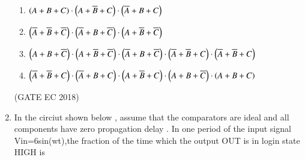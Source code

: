 \begin{enumerate}
\begin{enumerate}[label=(\Alph*)]
	\item $ \left(A+B+C\right) \cdot \left(A+\overline{B}+C\right) \cdot \left(\overline{A}+B+C\right) $
 	\item $ \left(\overline{A}+\overline{B}+\overline{C}\right) \cdot \left(\overline{A}+B+\overline{C}\right) \cdot \left(A+\overline{B}+\overline{C}\right) $
	\item $ \left(A+B+\overline{C}\right) \cdot \left(A+\overline{B}+\overline{C}\right) \cdot \left(\overline{A}+B+\overline{C}\right) \cdot \left(\overline{A}+\overline{B}+C\right) \cdot \left(\overline{A}+\overline{B}+C\right) $
	\item $ \left(\overline{A}+\overline{B}+C\right) \cdot \left(\overline{A}+B+C\right) \cdot \left(A+\overline{B}+C\right) \cdot \left(A+B+\overline{C}\right) \cdot \left(A+B+C\right) $
\end{enumerate}
\hfill(GATE EC 2018)




    \item 
        \label{prob:gate EC 9}
	 In the circiut shown below , assume that the comparators are ideal and all components have zero propagation delay . In one period of the input signal Vin=6sin(wt),the fraction of the time which the output OUT is in login state HIGH is 


\end{enumerate}
